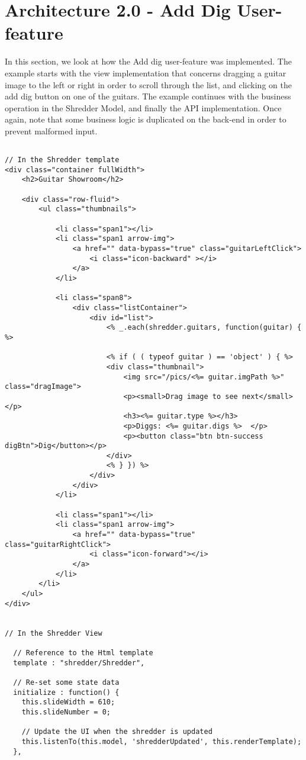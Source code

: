 \section{Architecture 2.0 - Add Dig User-feature}
In this section, we look at how the Add dig user-feature was implemented. The example starts with the view implementation that concerns dragging a guitar image to the left or right in order to scroll through the list, and clicking on the add dig button on one of the guitars. The example continues with the business operation in the Shredder Model, and finally the API implementation. Once again, note that some business logic is duplicated on the back-end in order to prevent malformed input. 

\begin{lstlisting}

// In the Shredder template
<div class="container fullWidth">
	<h2>Guitar Showroom</h2>

	<div class="row-fluid">
		<ul class="thumbnails">

			<li class="span1"></li>
			<li class="span1 arrow-img">
				<a href="" data-bypass="true" class="guitarLeftClick">
					<i class="icon-backward" ></i>
				</a>
			</li>

			<li class="span8">
				<div class="listContainer">
					<div id="list">
						<% _.each(shredder.guitars, function(guitar) { %>

						<% if ( ( typeof guitar ) == 'object' ) { %>
						<div class="thumbnail">
							<img src="/pics/<%= guitar.imgPath %>" class="dragImage">
							<p><small>Drag image to see next</small></p>
							<h3><%= guitar.type %></h3>
							<p>Diggs: <%= guitar.digs %>  </p>
							<p><button class="btn btn-success digBtn">Dig</button></p>
						</div>
						<% } }) %>
					</div>
				</div>
			</li>

			<li class="span1"></li>
			<li class="span1 arrow-img">
				<a href="" data-bypass="true" class="guitarRightClick">
					<i class="icon-forward"></i>
				</a>
			</li>
		</li>
	</ul>
</div>


// In the Shredder View  

  // Reference to the Html template
  template : "shredder/Shredder",
  
  // Re-set some state data
  initialize : function() {
    this.slideWidth = 610;
    this.slideNumber = 0;
    
    // Update the UI when the shredder is updated
    this.listenTo(this.model, 'shredderUpdated', this.renderTemplate);
  },


\end{lstlisting}

